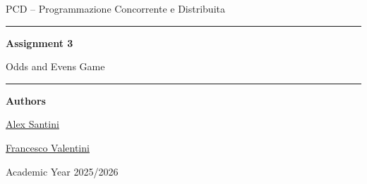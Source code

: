 \begin{titlepage}
    \centering
    \vspace*{2.2cm}

    {\Large PCD -- Programmazione Concorrente e Distribuita\par}
    \vspace{1.2cm}
    {\rule{0.82\textwidth}{0.5pt}\par}
    \vspace{0.9cm}
    {\huge\bfseries Assignment 3\par}
    \vspace{0.35cm}
    {\LARGE Odds and Evens Game\par}
    \vspace{0.45cm}
    \vspace{0.9cm}
    {\rule{0.82\textwidth}{0.5pt}\par}

    \vspace{1.6cm}
    {\large\textbf{Authors}\par}
    \vspace{0.25cm}
    {\large \href{https://github.com/AlexSantini10}{Alex Santini}\par}
    {\large \href{https://github.com/Val0rous}{Francesco Valentini}\par}

    \vfill
    {\large Academic Year 2025/2026\par}
    {\large \todayFullUK\par}
\end{titlepage}
